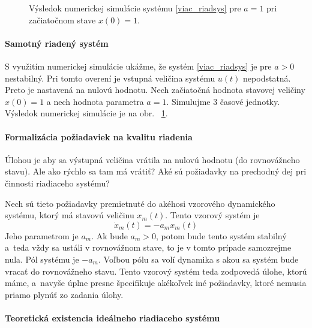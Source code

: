 \documentclass[a4paper, 10pt, ]{article}
\begin{document}



\begin{figure}[!t]
	\centering
	\caption{Výsledok numerickej simulácie systému \eqref{viac_riadsys} pre $a = 1$ pri začiatočnom stave $x(0) = 1$.}
	\label{Výsledok numerickej simulácie systému}
\end{figure}


\paragraph{Samotný riadený systém}

\noindent
S využitím numerickej simulácie ukážme, že systém \eqref{viac_riadsys} je pre $a>0$ nestabilný. Pri tomto overení je vstupná veličina systému $u(t)$ nepodstatná. Preto je nastavená na nulovú hodnotu. Nech začiatočná hodnota stavovej veličiny $x(0) = 1$ a nech hodnota parametra $a = 1$. Simulujme 3 časové jednotky. Výsledok numerickej simulácie  je na obr.~ \ref{Výsledok numerickej simulácie systému}.






\paragraph{Formalizácia požiadaviek na kvalitu riadenia}

Úlohou je aby sa výstupná veličina vrátila na nulovú hodnotu (do rovnovážneho stavu). Ale ako rýchlo sa tam má vrátiť? Aké sú požiadavky na prechodný dej pri činnosti riadiaceho systému?

Nech sú tieto požiadavky premietnuté do akéhosi vzorového dynamického systému, ktorý má stavovú veličinu $x_m(t)$. Tento vzorový systém je
\begin{equation} \label{viac_refmodel}
	\dot x_m(t) = -a_m x_m(t)
\end{equation}
Jeho parametrom je $a_m$. Ak bude $a_m > 0$, potom bude tento systém stabilný a~teda vždy sa ustáli v rovnovážnom stave, to je v tomto prípade samozrejme nula. Pól systému je $-a_m$. Voľbou pólu sa volí dynamika s akou sa systém bude vracať do rovnovážneho stavu. Tento vzorový systém teda zodpovedá úlohe, ktorú máme, a~navyše úplne presne špecifikuje akékoľvek iné požiadavky, ktoré nemusia priamo plynúť zo zadania úlohy.


\paragraph{Teoretická existencia ideálneho riadiaceho systému}
\end{document}
